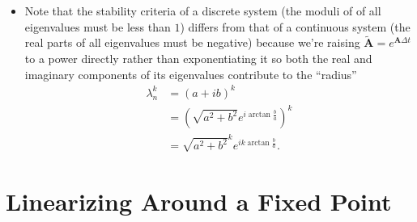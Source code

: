 \documentclass{article}
\renewcommand{\vec}[1]{\boldsymbol{\mathbf{#1}}}
\begin{document}
\begin{itemize}
  \item Note that the stability criteria of a discrete system (the moduli of of all eigenvalues must be less than $1$) differs from that of a continuous system (the real parts of all eigenvalues must be negative) because we're raising $\tilde{\vec{A}} = e^{\vec{A} \Delta t}$ to a power directly rather than exponentiating it so both the real and imaginary components of its eigenvalues contribute to the ``radius'' \begin{align*}
          \lambda_n^k & = (a + i b)^k                                     \\
                      & = (\sqrt{a^2 + b^2} e^{i \arctan \frac{b}{a}})^k  \\
                      & = \sqrt{a^2 + b^2}^k e^{i k \arctan \frac{b}{a}}.
        \end{align*}
\end{itemize}

\section{Linearizing Around a Fixed Point}
\end{document}
